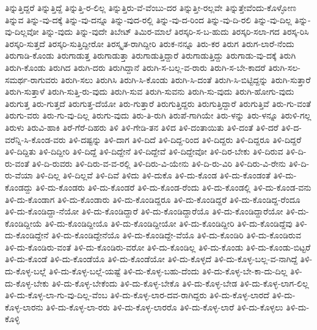 ತಿನ್ನುತ್ತಿದ್ದರೆ
ತಿನ್ನುತ್ತಿದ್ದೆ
ತಿನ್ನುತ್ತಿ-ರ-ಲಿಲ್ಲ
ತಿನ್ನುತ್ತಿರು-ವೆ-ವೆಂಬು-ದರ
ತಿನ್ನುತ್ತೀ-ರಲ್ಲವೇ
ತಿನ್ನುತ್ತೇವೆಂದು-ಕೊಳ್ಳೋಣ
ತಿನ್ನುವ
ತಿನ್ನು-ವು-ದಕ್ಕೆ
ತಿನ್ನು-ವು-ದನ್ನೂ
ತಿನ್ನು-ವುದ-ರಲ್ಲಿ
ತಿನ್ನು-ವು-ದ-ರಿಂದ
ತಿನ್ನು-ವು-ದಿ-ರಲಿ
ತಿನ್ನು-ವು-ದಿಲ್ಲ
ತಿನ್ನು-ವು-ದಿಲ್ಲವೋ
ತಿನ್ನು-ವುದು
ತಿನ್ನು-ವುದೇ
ತಿಬೇಟ್
ತಿಮಿರ-ಮಾಲೆ
ತಿರಸ್ಕರಿ-ಸ-ಬ-ಹುದು
ತಿರಸ್ಕರಿ-ಸಲಾ-ಗದ
ತಿರಸ್ಕ-ರಿಸಿ
ತಿರಸ್ಕರಿ-ಸುತ್ತದೆ
ತಿರಸ್ಕರಿ-ಸುತ್ತಿದ್ದೀರೋ
ತಿರಸ್ಕೃತ-ರಾಗಿದ್ದೀರಿ
ತಿರುಕ-ನನ್ನೂ
ತಿರು-ಕರ
ತಿರುಗ
ತಿರುಗ-ಲಾರೆ-ನೆಂದು
ತಿರುಗಾಡಿ-ಕೊಂಡು
ತಿರುಗಾಡುತ್ತ
ತಿರುಗಾಡುತ್ತಾ
ತಿರುಗಾಡುತ್ತಿದ್ದಾರೆ
ತಿರುಗಾಡುತ್ತಿದ್ದು
ತಿರುಗಾಡು-ವು-ದಕ್ಕೆ
ತಿರುಗಿ
ತಿರುಗಿ-ಕೊಂಡು
ತಿರುಗಿದ
ತಿರುಗಿ-ದರು
ತಿರುಗಿದ್ದಾನೆ
ತಿರುಗಿ-ಸ-ಬಲ್ಲ-ವ-ರಾರು
ತಿರುಗಿ-ಸ-ಬೇ-ಕಾದರೆ
ತಿರುಗಿ-ಸಲ-ಸಮರ್ಥ-ರಾಗುವರು
ತಿರುಗಿ-ಸಲು
ತಿರುಗಿಸಿ
ತಿರುಗಿ-ಸಿ-ಕೊಂಡು
ತಿರುಗಿ-ಸಿ-ದಂತೆ
ತಿರುಗಿ-ಸಿ-ಬಿಟ್ಟಿದ್ದನ್ನು
ತಿರುಗಿ-ಸುತ್ತಾರೆ
ತಿರುಗಿ-ಸುತ್ತಾಳೆ
ತಿರುಗಿ-ಸುತ್ತಿ-ರು-ವುದು
ತಿರುಗಿ-ಸುವ
ತಿರುಗಿ-ಸುವನು
ತಿರುಗಿ-ಸು-ವುದು
ತಿರುಗಿ-ಹೋಗು-ವುದು
ತಿರುಗುತ್ತ
ತಿರು-ಗುತ್ತದೆ
ತಿರುಗುತ್ತ-ದೆಯೋ
ತಿರು-ಗುತ್ತಾರೆ
ತಿರುಗುತ್ತಿದ್ದರು
ತಿರುಗುತ್ತಿದ್ದಾರೆ
ತಿರುಗುತ್ತಿವೆ
ತಿರು-ಗು-ವಂತೆ
ತಿರುಗು-ವರು
ತಿರು-ಗು-ವು-ದಿಲ್ಲ
ತಿರುಗು-ವುದು
ತಿರು-ತಿ-ರುಗಿ
ತಿರುಪೆ-ಗಾಗಿಯೇ
ತಿರು-ಳನ್ನು
ತಿರು-ಳನ್ನೂ
ತಿರುಳಿ-ಗಲ್ಲ
ತಿರುಳು
ತಿರುವಿ-ಹಾಕಿ
ತಿರೆ-ಗೆರೆ-ದಿಹರು
ತಿಳಿ
ತಿಳಿ-ಗೇಡಿ-ತನ
ತಿಳಿದ
ತಿಳಿ-ದಂತಾಯಿತು
ತಿಳಿ-ದಂತೆ
ತಿಳಿ-ದರೆ
ತಿಳಿ-ದ-ವರೆನ್ನಿ-ಸಿ-ಕೊಂಡ-ವರು
ತಿಳಿ-ದಷ್ಟನ್ನು
ತಿಳಿ-ದಾಗ
ತಿಳಿ-ದಿದೆ
ತಿಳಿ-ದಿದ್ದ-ರಿಂದ
ತಿಳಿ-ದಿದ್ದರು
ತಿಳಿ-ದಿದ್ದರೂ
ತಿಳಿ-ದಿದ್ದರೆ
ತಿಳಿ-ದಿದ್ದಿತು
ತಿಳಿ-ದಿದ್ದೀರಿ
ತಿಳಿ-ದಿದ್ದೆ
ತಿಳಿ-ದಿದ್ದೇನೆ
ತಿಳಿ-ದಿದ್ದೇವೆ
ತಿಳಿ-ದಿದ್ದೇವೋ
ತಿಳಿ-ದಿರ-ಬೇಕು
ತಿಳಿ-ದಿರುವ
ತಿಳಿ-ದಿ-ರು-ವಂತೆ
ತಿಳಿ-ದಿ-ರುವರು
ತಿಳಿ-ದಿರು-ವ-ವ-ರಲ್ಲಿ
ತಿಳಿ-ದಿರು-ವಿ-ಯೇನು
ತಿಳಿ-ದಿ-ರು-ವಿರಿ
ತಿಳಿ-ದಿರು-ವಿ-ರೇನು
ತಿಳಿ-ದಿ-ರು-ವೆಯಾ
ತಿಳಿ-ದಿಲ್ಲ
ತಿಳಿ-ದಿಲ್ಲವೆ
ತಿಳಿ-ದಿವೆ
ತಿಳಿದು
ತಿಳಿ-ದುಕೊ
ತಿಳಿ-ದು-ಕೊಂಡ
ತಿಳಿ-ದು-ಕೊಂಡಂತೆ
ತಿಳಿ-ದು-ಕೊಂಡದ್ದು
ತಿಳಿ-ದು-ಕೊಂಡರು
ತಿಳಿ-ದು-ಕೊಂಡರೆ
ತಿಳಿ-ದು-ಕೊಂಡ-ರೆಂದು
ತಿಳಿ-ದು-ಕೊಂಡಲ್ಲಿ
ತಿಳಿ-ದು-ಕೊಂಡ-ವನು
ತಿಳಿ-ದು-ಕೊಂಡಾಗ
ತಿಳಿ-ದು-ಕೊಂಡಾರು
ತಿಳಿ-ದು-ಕೊಂಡಿದ್ದರೂ
ತಿಳಿ-ದು-ಕೊಂಡಿದ್ದರೆ
ತಿಳಿ-ದು-ಕೊಂಡಿದ್ದ-ರೆಂದೂ
ತಿಳಿ-ದು-ಕೊಂಡಿದ್ದಾ-ನೆಯೋ
ತಿಳಿ-ದು-ಕೊಂಡಿದ್ದಾರೆ
ತಿಳಿ-ದು-ಕೊಂಡಿದ್ದಾರೆಯೊ
ತಿಳಿ-ದು-ಕೊಂಡಿದ್ದಾರೆಯೋ
ತಿಳಿ-ದು-ಕೊಂಡಿದ್ದೀಯೆ
ತಿಳಿ-ದು-ಕೊಂಡಿದ್ದೀಯೊ
ತಿಳಿ-ದು-ಕೊಂಡಿದ್ದೀಯೋ
ತಿಳಿ-ದು-ಕೊಂಡಿದ್ದೀರಿ
ತಿಳಿ-ದು-ಕೊಂಡಿದ್ದೆವು
ತಿಳಿ-ದು-ಕೊಂಡಿದ್ದೇನೆ
ತಿಳಿ-ದು-ಕೊಂಡಿದ್ದೇನೆಯೊ
ತಿಳಿ-ದು-ಕೊಂಡಿದ್ದೇ-ವೆಯೊ
ತಿಳಿ-ದು-ಕೊಂಡಿರಿ
ತಿಳಿ-ದು-ಕೊಂಡಿರುವ
ತಿಳಿ-ದು-ಕೊಂಡಿರು-ವಂತೆ
ತಿಳಿ-ದು-ಕೊಂಡಿರು-ವರೋ
ತಿಳಿ-ದು-ಕೊಂಡಿಲ್ಲ
ತಿಳಿ-ದು-ಕೊಂಡು
ತಿಳಿ-ದು-ಕೊಂಡು-ಬಿಟ್ಟರೆ
ತಿಳಿ-ದು-ಕೊಂಡೆ
ತಿಳಿ-ದು-ಕೊಂಡೆಯೊ
ತಿಳಿ-ದು-ಕೊಂಡೆಯೋ
ತಿಳಿ-ದು-ಕೊಳ್ಳದೆ
ತಿಳಿ-ದು-ಕೊಳ್ಳ-ಬಲ್ಲ-ವ-ನಾಗಿದ್ದೆ
ತಿಳಿ-ದು-ಕೊಳ್ಳ-ಬಲ್ಲೆ
ತಿಳಿ-ದು-ಕೊಳ್ಳ-ಬಲ್ಲೆ-ಯಷ್ಟೆ
ತಿಳಿ-ದು-ಕೊಳ್ಳ-ಬಹು-ದೆಂದು
ತಿಳಿ-ದು-ಕೊಳ್ಳ-ಬೇ-ಕಾ-ದು-ದಿಲ್ಲ
ತಿಳಿ-ದು-ಕೊಳ್ಳ-ಬೇಕು
ತಿಳಿ-ದು-ಕೊಳ್ಳ-ಬೇಕೆಂದು
ತಿಳಿ-ದು-ಕೊಳ್ಳ-ಬೇಕೊ
ತಿಳಿ-ದು-ಕೊಳ್ಳ-ಬೇಡ
ತಿಳಿ-ದು-ಕೊಳ್ಳ-ಲಾಗ-ಲಿಲ್ಲ
ತಿಳಿ-ದು-ಕೊಳ್ಳ-ಲಾ-ಗು-ವು-ದಿಲ್ಲ-ವೆಂಬ
ತಿಳಿ-ದು-ಕೊಳ್ಳ-ಲಾರ-ದವ-ರಾಗಿದ್ದರು
ತಿಳಿ-ದು-ಕೊಳ್ಳ-ಲಾರದೆ
ತಿಳಿ-ದು-ಕೊಳ್ಳ-ಲಾರನು
ತಿಳಿ-ದು-ಕೊಳ್ಳ-ಲಾ-ರರು
ತಿಳಿ-ದು-ಕೊಳ್ಳ-ಲಾರರೊ
ತಿಳಿ-ದು-ಕೊಳ್ಳ-ಲಾರೆ
ತಿಳಿ-ದು-ಕೊಳ್ಳಲು
ತಿಳಿ-ದು-ಕೊಳ್ಳಿ
